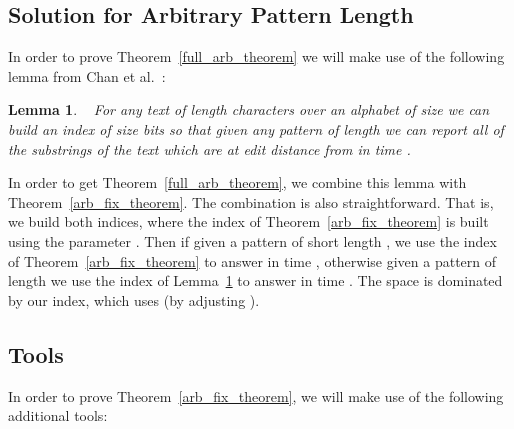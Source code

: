 \documentclass{article}
\newcommand{\?}{\mskip1.5mu}
\newtheorem{lemma}{Lemma}
\begin{document}
\subsection{Solution for Arbitrary Pattern Length}
\label{section:full_arb_solution}
In order to prove Theorem~\ref{full_arb_theorem} we will make use of the following lemma from Chan et al.~\cite{chan2011linear}: 
\begin{lemma}~\cite[Section 2.3,Theorem 6]{chan2011linear}
\label{CLSTW06b1_fix_theorem}
For any text  of length  characters over an alphabet of size  we can build an index of size  bits so that given any pattern  of length  we can report all of the  substrings of the text which are at edit distance  from  in time . 
\end{lemma}
In order to get Theorem~\ref{full_arb_theorem}, we combine this lemma with Theorem~\ref{arb_fix_theorem}. 
The combination is also straightforward. That is, we build both indices, where the index of Theorem~\ref{arb_fix_theorem} is built using the parameter . Then if given a pattern of short length , we use the index of Theorem~\ref{arb_fix_theorem} to answer in time , otherwise given a pattern of length  we use the index of Lemma~\ref{CLSTW06b1_fix_theorem} to answer in time . The space is dominated by our index, which uses  (by adjusting ).
\subsection{Tools}
\label{section:arb_tools}
In order to prove Theorem~\ref{arb_fix_theorem}, we will make use of the following additional tools:
\end{document}
